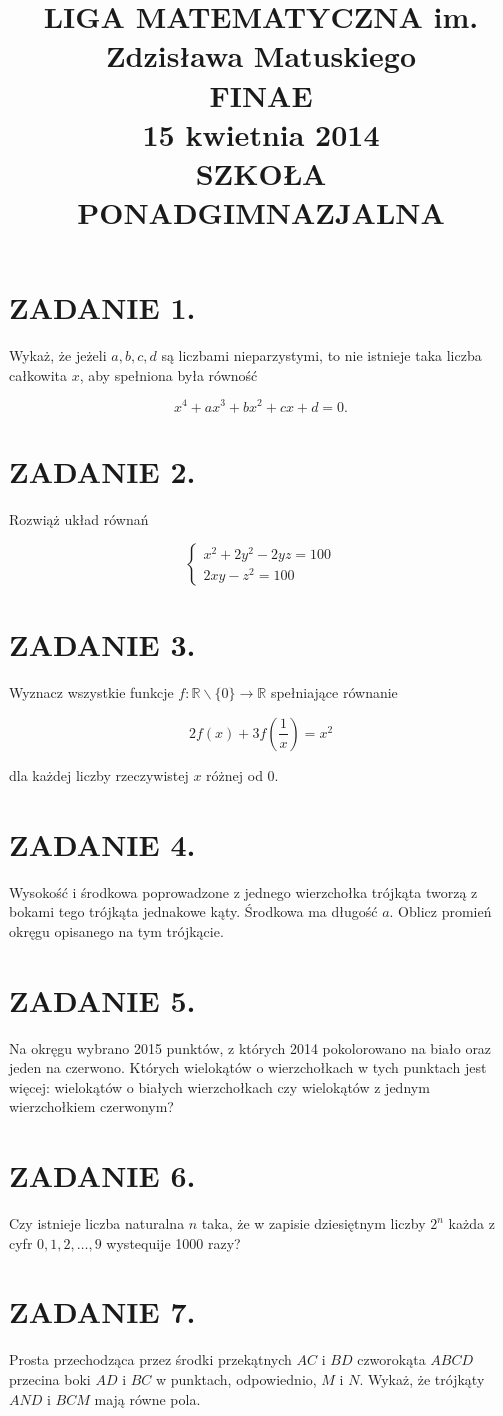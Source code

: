 \documentclass[10pt]{article}
\title{LIGA MATEMATYCZNA im. Zdzisława Matuskiego \\
 FINAE \\
 15 kwietnia 2014 \\
 SZKOŁA PONADGIMNAZJALNA }
\author{}
\date{}
\begin{document}
\maketitle
\section*{ZADANIE 1.}
Wykaż, że jeżeli \(a, b, c, d\) są liczbami nieparzystymi, to nie istnieje taka liczba całkowita \(x\), aby spełniona była równość

\[
x^{4}+a x^{3}+b x^{2}+c x+d=0 .
\]

\section*{ZADANIE 2.}
Rozwiąż układ równań

\[
\left\{\begin{array}{l}
x^{2}+2 y^{2}-2 y z=100 \\
2 x y-z^{2}=100
\end{array}\right.
\]

\section*{ZADANIE 3.}
Wyznacz wszystkie funkcje \(f: \mathbb{R} \backslash\{0\} \rightarrow \mathbb{R}\) spełniające równanie

\[
2 f(x)+3 f\left(\frac{1}{x}\right)=x^{2}
\]

dla każdej liczby rzeczywistej \(x\) różnej od 0.

\section*{ZADANIE 4.}
Wysokość i środkowa poprowadzone z jednego wierzchołka trójkąta tworzą z bokami tego trójkąta jednakowe kąty. Środkowa ma długość \(a\). Oblicz promień okręgu opisanego na tym trójkącie.

\section*{ZADANIE 5.}
Na okręgu wybrano 2015 punktów, z których 2014 pokolorowano na biało oraz jeden na czerwono. Których wielokątów o wierzchołkach w tych punktach jest więcej: wielokątów o białych wierzchołkach czy wielokątów z jednym wierzchołkiem czerwonym?

\section*{ZADANIE 6.}
Czy istnieje liczba naturalna \(n\) taka, że w zapisie dziesiętnym liczby \(2^{n}\) każda z cyfr \(0,1,2, \ldots, 9\) wystequije 1000 razy?

\section*{ZADANIE 7.}
Prosta przechodząca przez środki przekątnych \(A C\) i \(B D\) czworokąta \(A B C D\) przecina boki \(A D\) i \(B C\) w punktach, odpowiednio, \(M\) i \(N\). Wykaż, że trójkąty \(A N D\) i \(B C M\) mają równe pola.
\end{document}
